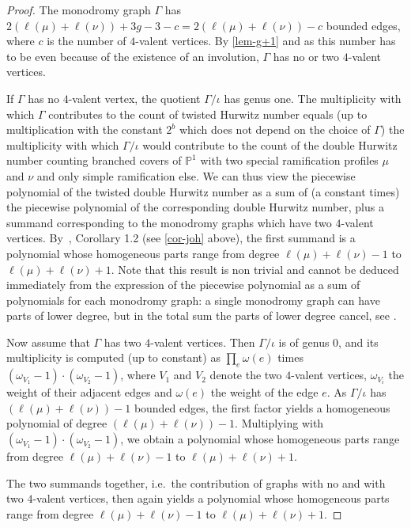 \documentclass[ALCO,published]{cedram}
\begin{document}
 \begin{proof}
 The monodromy graph $\Gamma$ has $2(\ell(\mu)+\ell(\nu))+3g-3-c=2(\ell(\mu)+\ell(\nu))-c$ bounded edges, where $c$ is the number of $4$-valent vertices. By \cref{lem-g+1} and as this number has to be even because of the existence of an involution, $\Gamma$ has no or two $4$-valent vertices.
 
 If $\Gamma$ has no $4$-valent vertex, the quotient $\Gamma/\iota$
 has genus one. The multiplicity with which $\Gamma$ contributes to the count of twisted Hurwitz number equals (up to multiplication with the constant $2^{b}$ which does not depend on the choice of $\Gamma$) the multiplicity with which $\Gamma/\iota$ would contribute to the count of the double Hurwitz number counting branched covers of $\mathbb{P}^1$ with two special ramification profiles $\mu$ and $\nu$ and only simple ramification else. 
 We can thus view the piecewise polynomial of the twisted double Hurwitz number as a sum of (a constant times) the piecewise polynomial of the corresponding double Hurwitz number, plus a summand corresponding to the monodromy graphs which have two $4$-valent vertices. 
 By~\cite{Joh15}, Corollary 1.2 (see \cref{cor-joh} above), the first summand is a polynomial whose homogeneous parts range from degree $\ell(\mu)+\ell(\nu)-1$ to $\ell(\mu)+\ell(\nu)+1$.
 Note that this result is non trivial and cannot be deduced immediately from the expression of the piecewise polynomial as a sum of polynomials for each monodromy graph: a single monodromy graph can have parts of lower degree, but in the total sum the parts of lower degree cancel, see \cite[Example~3.12]{CJM11}.
 
  Now assume that $\Gamma$ has two $4$-valent vertices. 
 Then $\Gamma/\iota$ is of genus $0$, and its multiplicity is computed (up to constant) as $\prod_e \omega(e)$ times $(\omega_{V_1}-1)\cdot (\omega_{V_2}-1)$, where $V_1$ and $V_2$ denote the two $4$-valent vertices, $\omega_{V_i}$ the weight of their adjacent edges and $\omega(e)$ the weight of the edge $e$.
 As $\Gamma/\iota$ has $(\ell(\mu)+\ell(\nu))-1$ bounded edges, the first factor yields a homogeneous polynomial of degree $(\ell(\mu)+\ell(\nu))-1$. Multiplying with $(\omega_{V_1}-1)\cdot (\omega_{V_2}-1)$, we obtain a polynomial whose homogeneous parts range from degree $\ell(\mu)+\ell(\nu)-1$ to $\ell(\mu)+\ell(\nu)+1$.
 
 The two summands together, i.e.\ the contribution of graphs with no and with two $4$-valent vertices, then again yields a polynomial whose homogeneous parts range from degree $\ell(\mu)+\ell(\nu)-1$ to $\ell(\mu)+\ell(\nu)+1$.
\end{proof}
\end{document}

